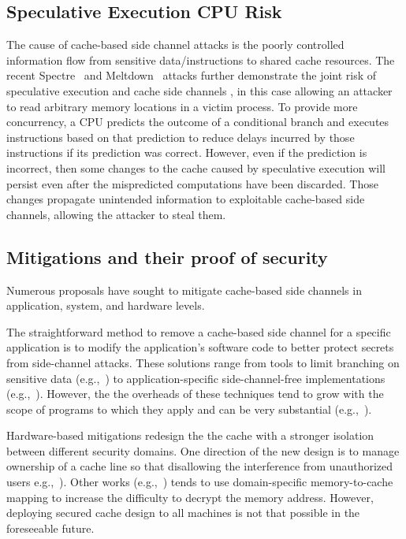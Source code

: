 \subsection{Speculative Execution CPU Risk}
The cause of cache-based side channel attacks is the poorly controlled
information flow from sensitive data/instructions to shared cache
resources. The recent Spectre~\cite{spectre} and
Meltdown~\cite{meltdown} attacks further demonstrate the joint risk of
speculative execution and cache side channels , in this case allowing
an attacker to read arbitrary memory locations in a victim process. To
provide more concurrency, a CPU predicts the outcome of a conditional
branch and executes instructions based on that prediction to reduce
delays incurred by those instructions if its prediction was correct.
However, even if the prediction is incorrect, then some changes to
the cache caused by speculative execution will persist even after the
mispredicted computations have been discarded. Those changes
propagate unintended information to exploitable cache-based side
channels, allowing the attacker to steal them.

\subsection{Mitigations and their proof of security}
Numerous proposals have sought to mitigate cache-based side channels
in application, system, and hardware levels. 

The straightforward method to remove a cache-based side channel for a
specific application is to modify the application's software code to
better protect secrets from side-channel attacks.  These solutions
range from tools to limit branching on sensitive data
(e.g.,~\cite{coppens2009practical, crane2015thwarting}) to
application-specific side-channel-free implementations
(e.g.,~\cite{konighofer2008fast}).  However, the the overheads of
these techniques tend to grow with the scope of programs to which they
apply and can be very substantial (e.g.,~\cite{rane2015raccoon}). 

Hardware-based mitigations redesign the the cache with a stronger
isolation between different security domains. One direction of the new
design is to manage ownership of a cache line so that disallowing the
interference from unauthorized users e.g.,~\cite{wang2008novel,
keramidas2008non, Liu:2014:RFC}). Other works
(e.g.,~\cite{scatterCache,phantomCache}) tends to use domain-specific
memory-to-cache mapping to increase the difficulty to decrypt the
memory address. However, deploying secured cache design to all
machines is not that possible in the foreseeable future. 

